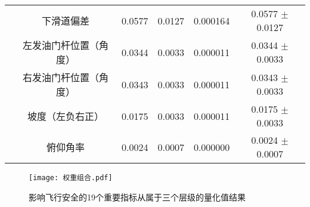 \documentclass{MathorCupModeling}
\begin{document}
\begin{table}[H]
{\begin{tabular}{cccccc}
			& 下滑道偏差 & 0.0577  & 0.0127  & 0.000164  & 0.0577 $\pm$ 0.0127 \\
			& 左发油门杆位置（角度） & 0.0344  & 0.0033  & 0.000011  & 0.0344 $\pm$ 0.0033 \\
			& 右发油门杆位置（角度） & 0.0343  & 0.0033  & 0.000011  & 0.0343 $\pm$ 0.0033 \\
			& 坡度（左负右正） & 0.0175  & 0.0033  & 0.000011  & 0.0175 $\pm$ 0.0033 \\
			& 俯仰角率  & 0.0024  & 0.0007  & 0.000000  & 0.0024 $\pm$ 0.0007 \\
	  \bottomrule
	  \end{tabular}}
	\label{tab:重要指标量化}
\end{table}
	\begin{figure}[H]
		\centering
		\texttt{[image: 权重组合.pdf]}
		\caption{影响飞行安全的19个重要指标从属于三个层级的量化值结果}
		\label{fig:权重组合}
	\end{figure}
\end{document}
